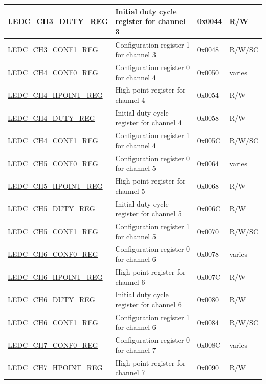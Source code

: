 \begin{longtable}{ | p{6cm} | p{7cm} | p{1.3cm} | p{1.7cm}| }
\hyperref[regdesc:LEDCCHNDUTYREG]{LEDC\_CH3\_DUTY\_REG} & Initial duty cycle register for channel 3 & 0x0044 & R/W \\ \hline
\hyperref[regdesc:LEDCCHNCONF1REG]{LEDC\_CH3\_CONF1\_REG} & Configuration register 1 for channel 3 & 0x0048 & R/W/SC \\ \hline
\hyperref[regdesc:LEDCCHNCONF0REG]{LEDC\_CH4\_CONF0\_REG} & Configuration register 0 for channel 4 & 0x0050 & varies \\ \hline
\hyperref[regdesc:LEDCCHNHPOINTREG]{LEDC\_CH4\_HPOINT\_REG} & High point register for channel 4 & 0x0054 & R/W \\ \hline
\hyperref[regdesc:LEDCCHNDUTYREG]{LEDC\_CH4\_DUTY\_REG} & Initial duty cycle register for channel 4 & 0x0058 & R/W \\ \hline
\hyperref[regdesc:LEDCCHNCONF1REG]{LEDC\_CH4\_CONF1\_REG} & Configuration register 1 for channel 4 & 0x005C & R/W/SC \\ \hline
\hyperref[regdesc:LEDCCHNCONF0REG]{LEDC\_CH5\_CONF0\_REG} & Configuration register 0 for channel 5 & 0x0064 & varies \\ \hline
\hyperref[regdesc:LEDCCHNHPOINTREG]{LEDC\_CH5\_HPOINT\_REG} & High point register for channel 5 & 0x0068 & R/W \\ \hline
\hyperref[regdesc:LEDCCHNDUTYREG]{LEDC\_CH5\_DUTY\_REG} & Initial duty cycle register for channel 5 & 0x006C & R/W \\ \hline
\hyperref[regdesc:LEDCCHNCONF1REG]{LEDC\_CH5\_CONF1\_REG} & Configuration register 1 for channel 5 & 0x0070 & R/W/SC \\ \hline
\hyperref[regdesc:LEDCCHNCONF0REG]{LEDC\_CH6\_CONF0\_REG} & Configuration register 0 for channel 6 & 0x0078 & varies \\ \hline
\hyperref[regdesc:LEDCCHNHPOINTREG]{LEDC\_CH6\_HPOINT\_REG} & High point register for channel 6 & 0x007C & R/W \\ \hline
\hyperref[regdesc:LEDCCHNDUTYREG]{LEDC\_CH6\_DUTY\_REG} & Initial duty cycle register for channel 6 & 0x0080 & R/W \\ \hline
\hyperref[regdesc:LEDCCHNCONF1REG]{LEDC\_CH6\_CONF1\_REG} & Configuration register 1 for channel 6 & 0x0084 & R/W/SC \\ \hline
\hyperref[regdesc:LEDCCHNCONF0REG]{LEDC\_CH7\_CONF0\_REG} & Configuration register 0 for channel 7 & 0x008C & varies \\ \hline
\hyperref[regdesc:LEDCCHNHPOINTREG]{LEDC\_CH7\_HPOINT\_REG} & High point register for channel 7 & 0x0090 & R/W \\ \hline

\end{longtable}
